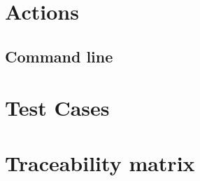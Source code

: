 \documentclass[12pt]{article}
\begin{document}
\section{Actions}
\subsection{Command line}

\section{Test Cases}


\section{Traceability matrix}
\end{document}
